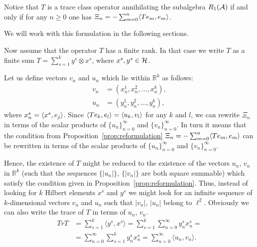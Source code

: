 \documentclass[12pt]{amsart}
\theoremstyle{case}
\begin{document}
  \begin{prop}
    \label{prop:reformulation}
    Notice that $T$ is a trace class operator annihilating the subalgebra $R_1(\cal{A})$ if and only if
      for any $n \geq 0$ one has $\Xi_n = -\sum_{m=0}^n \inner{Te_m}{e_m}$.
  \end{prop}
    We will work with this formulation in the following sections.

  Now assume that the operator $T$ has a finite rank.
  In that case we write $T$ as a finite sum $T = \sum_{s=1}^k y^s \otimes x^s$,
    where $x^s, y^s \in \cal{H}$.

  Let us define vectors $v_n$ and $u_n$ which lie within $\mathbb{R}^k$ as follows:
  \begin{align*}
    v_n &= (x^1_n, x^2_n, \dots, x^k_n),\\
    u_n &= (y^1_n, y^2_n, \dots, y^k_n),
  \end{align*}
  where $x^s_n = \inner{x^s}{e_j}$.
  Since $\inner{Te_k}{e_l} = \inner{u_k}{v_l}$ for any $k$ and $l$, we can rewrite $\Xi_n$ in terms of
    the scalar products of $\{u_n\}_{n=0}^\infty$ and $\{v_n\}_{n=0}^\infty$.
  In turn it means that the condition from Proposition~\ref{prop:reformulation} $\Xi_n = -\sum_{m=0}^n \inner{Te_m}{e_m}$
    can be rewritten in terms of the scalar products of $\{u_n\}_{n=0}^\infty$ and $\{v_n\}_{n=0}^\infty$.

  Hence, the existence of $T$ might be reduced to the existence of
    the vectors $u_n$, $v_n$ in $\mathbb{R}^k$ (such that the sequences $\{\lvert u_n\rvert\}$, $\{\lvert v_n\rvert\}$ are both square summable)
    which satisfy the condition given in Proposition~\ref{prop:reformulation}.
  Thus, instead of looking for $k$ Hilbert elements $x^s$ and $y^s$ we might look for an infinite sequence
    of $k$-dimensional vectors $v_n$ and $u_n$ such that $\lvert v_n \rvert$, $\lvert u_n \rvert$ belong to $\ell^2$.
  Obviously we can also write the trace of $T$ in terms of $u_n$, $v_n$.
  \begin{align*}
    Tr T &= \sum_{s=1}^k \langle y^s, x^s \rangle = \sum_{s=1}^k \sum_{n=0}^\infty y^s_n x^s_n =\\
         &= \sum_{n=0}^\infty \sum_{s=1}^k y^s_n x^s_n = \sum_{n=0}^\infty \langle u_n, v_n \rangle.
  \end{align*}
\end{document}
